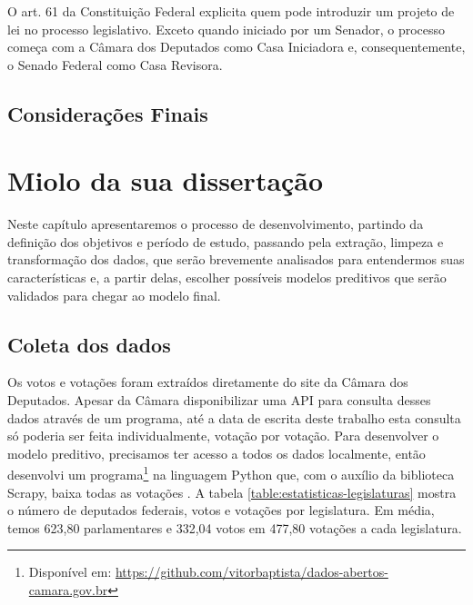 \documentclass[a4paper,titlepage]{ppgi}\usepackage[]{graphicx}\usepackage[]{color}
\makeatletter
\newenvironment{kframe}{%
 \def\at@end@of@kframe{}%
 \ifinner\ifhmode%
  \def\at@end@of@kframe{\end{minipage}}%
  \begin{minipage}{\columnwidth}%
 \fi\fi%
 \def\FrameCommand##1{\hskip\@totalleftmargin \hskip-\fboxsep
 \colorbox{shadecolor}{##1}\hskip-\fboxsep
     \hskip-\linewidth \hskip-\@totalleftmargin \hskip\columnwidth}%
 \MakeFramed {\advance\hsize-\width
   \@totalleftmargin\z@ \linewidth\hsize
   \@setminipage}}%
 {\par\unskip\endMakeFramed%
 \at@end@of@kframe}
\newenvironment{knitrout}{}{} %
\makeatother
\begin{document}
O art. 61 da Constituição Federal explicita quem pode introduzir um projeto de
lei no processo legislativo. Exceto quando iniciado por um Senador, o processo
começa com a Câmara dos Deputados como Casa Iniciadora e, consequentemente, o
Senado Federal como Casa Revisora.

\section{Considerações Finais}


\begin{knitrout}
\color{fgcolor}\begin{kframe}


{\ttfamily\noindent\bfseries\color{errorcolor}{\#\# Error in `[<-.data.frame`(`*tmp*`, data[, column] == "{}"{}, column, value = NA): missing values are not allowed in subscripted assignments of data frames}}\end{kframe}
\end{knitrout}

\chapter{Miolo da sua dissertação}\label{cap:miolo}

Neste capítulo apresentaremos o processo de desenvolvimento, partindo da
definição dos objetivos e período de estudo, passando pela extração, limpeza e
transformação dos dados, que serão brevemente analisados para entendermos suas
características e, a partir delas, escolher possíveis modelos preditivos que
serão validados para chegar ao modelo final.

\section{Coleta dos dados}




Os votos e votações foram extraídos diretamente do site da Câmara dos
Deputados. Apesar da Câmara disponibilizar uma \gls{API} para consulta desses
dados através de um programa, até a data de escrita deste trabalho esta
consulta só poderia ser feita individualmente, votação por votação. Para
desenvolver o modelo preditivo, precisamos ter acesso a todos os dados
localmente, então desenvolvi um programa\footnote{Disponível em:
\url{https://github.com/vitorbaptista/dados-abertos-camara.gov.br}} na
linguagem Python que, com o auxílio da biblioteca Scrapy, baixa todas as
votações \cite{Python276,Scrapy}. A tabela
\ref{table:estatisticas-legislaturas} mostra o número de deputados federais,
votos e votações por legislatura. Em média, temos 623,80
parlamentares e 332,04 votos em
477,80 votações a cada legislatura.
\nocite{CamaraDosDeputados2015}
\end{document}
